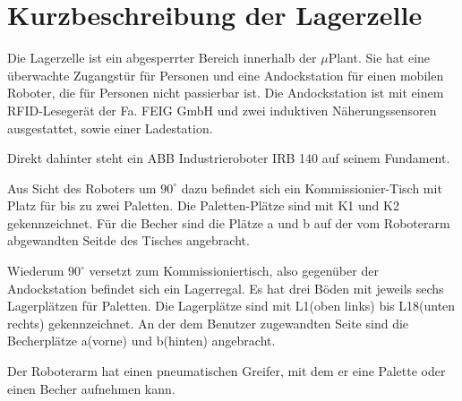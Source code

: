 \chapter{Kurzbeschreibung der Lagerzelle}\label{Lagerzelle}

    Die Lagerzelle ist ein abgesperrter Bereich innerhalb der $\mu$Plant. 
    Sie hat eine überwachte Zugangstür für Personen und eine Andockstation für einen mobilen Roboter, die für Personen nicht passierbar ist. 
    Die Andockstation ist mit einem RFID-Lesegerät der Fa. FEIG GmbH und zwei induktiven Näherungssensoren ausgestattet, sowie einer 
    Ladestation. 
    
    Direkt dahinter steht ein ABB Industrieroboter IRB 140 auf seinem Fundament. 

    Aus Sicht des Roboters um $90^\circ$ dazu befindet sich ein Kommissionier-Tisch mit Platz für bis zu zwei Paletten.
    Die Paletten-Plätze sind mit \glqq K1\grqq{} und \glqq K2\grqq{} gekennzeichnet.
    Für die Becher sind die Plätze \glqq a\grqq{} und \glqq b\grqq{} auf der vom Roboterarm abgewandten Seitde des Tisches
    angebracht.

    Wiederum $90^\circ$ versetzt zum Kommissioniertisch, also gegenüber der Andockstation befindet sich ein Lagerregal.
    Es hat drei Böden mit jeweils sechs Lagerplätzen für Paletten.
    Die Lagerplätze sind mit \glqq L1\grqq{}(oben links) bis \glqq L18\grqq{}(unten rechts) gekennzeichnet.
    An der dem Benutzer zugewandten Seite sind die Becherplätze \glqq a\grqq{}(vorne) und \glqq b\grqq{}(hinten) angebracht.
    
    Der Roboterarm hat einen pneumatischen Greifer, mit dem er eine Palette oder einen Becher aufnehmen kann. 